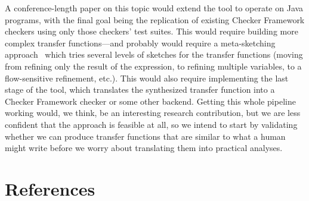 \documentclass[10pt,conference]{IEEEtran}
\begin{document}
A conference-length paper on this topic would extend the tool to operate
on Java programs, with the final goal being the replication of
existing Checker Framework checkers using only those checkers'
test suites. This would require building more
complex transfer functions---and probably would require
a meta-sketching approach~\cite{metasketching} which tries several levels of
sketches for the transfer functions (moving from refining only the result of the expression, to
refining multiple variables, to a flow-sensitive refinement, etc.).
This would also require implementing the last stage of the tool, which
translates the synthesized transfer function into a Checker Framework
checker or some other backend. Getting this whole pipeline working would,
we think, be an interesting research contribution, but we are less
confident that the approach is feasible at all, so we intend to start
by validating whether we can produce transfer functions that are
similar to what a human might write before we worry about translating
them into practical analyses.

\section{References}

\begingroup
\renewcommand{\section}[2]{}%



%
%
\endgroup
\end{document}
